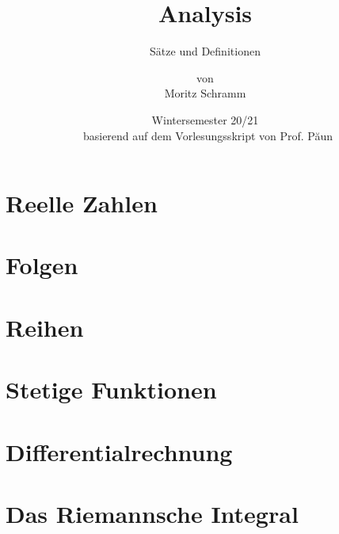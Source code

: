 \documentclass[a4paper, 12pt]{report}
\institute{Universität Bayreuth}
\title{Analysis}
\subtitle{Sätze und Definitionen}
\author{von\\Moritz Schramm}%
\date{Wintersemester 20/21\\ \small basierend auf dem Vorlesungsskript von Prof. Păun }
\begin{document}
	\maketitle
	\romantableofcontents
	
	\chapter{Reelle Zahlen}
	
	
	\chapter{Folgen}
	
	
	\chapter{Reihen}
	
	
	\chapter{Stetige Funktionen}
	
	
	\chapter{Differentialrechnung}
	
	
	\chapter{Das Riemannsche Integral}
	
	
\end{document}
